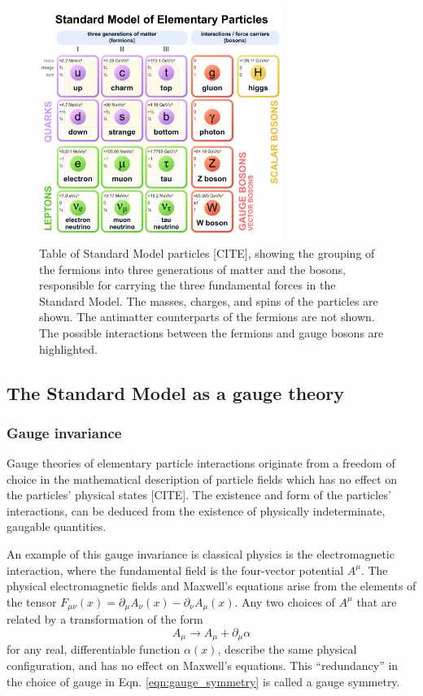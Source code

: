 \documentclass{article}
\begin{document}
\begin{figure}[ht]
    \centering
    \includegraphics[width=8cm]{figures/Standard_Model_of_Elementary_Particles.pdf}
    \caption{Table of Standard Model particles [CITE], showing the grouping of the fermions into three generations of matter and the bosons, responsible for carrying the three fundamental forces in the Standard Model. The masses, charges, and spins of the particles are shown. The antimatter counterparts of the fermions are not shown. The possible interactions between the fermions and gauge bosons are highlighted.}
    \label{fig:intro-standard-model}
\end{figure}



\subsection{The Standard Model as a gauge theory}


\subsubsection{Gauge invariance}
Gauge theories of elementary particle interactions originate from a freedom of choice in the mathematical description of particle fields which has no effect on the particles' physical states [CITE]. The existence and form of the particles' interactions, can be deduced from the existence of physically indeterminate, gaugable quantities.

An example of this gauge invariance is classical physics is the electromagnetic interaction, where the fundamental field is the four-vector potential $A^\mu$. The physical electromagnetic fields and Maxwell's equations arise from the elements of the tensor $F_{\mu\nu}(x) = \partial_\mu A_\nu (x) - \partial_\nu A_\mu (x)$. Any two choices of $A^\mu$ that are related by a transformation of the form \begin{equation} A_\mu \rightarrow A_\mu + \partial_\mu \alpha \label{eqn:gauge_symmetry}\end{equation} for any real, differentiable function $\alpha(x)$, describe the same physical configuration, and has no effect on Maxwell's equations. This ``redundancy'' in the choice of gauge in Eqn. \ref{eqn:gauge_symmetry} is called a gauge symmetry.
\end{document}
